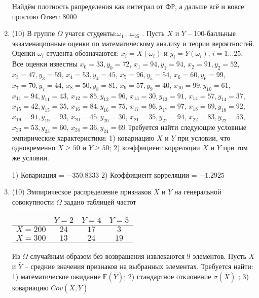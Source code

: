 \documentclass[a4paper,12pt]{article}
\begin{document}
\begin{enumerate}
Найдём плотность рапределения как интеграл от ФР, а дальше всё и вовсе простою Ответ: $8000$


\item


(10) В группе $\Omega$ учатся студенты:$\omega _{1}...\omega _{25}$ . Пусть $X$ и $Y$ – 100-балльные экзаменационные оценки по
математическому анализу и теории вероятностей. Оценки $\omega _{i}$ студента обозначаются: $x _{i} = X(\omega _{i})$ и $y _{i} = Y(\omega _{i})$, $i = 1...25$. Все оценки известны
$x _{0} = 33, y _{0} = 72$, $x _{1} = 94, y _{1} = 94$, $x _{2} = 91, y _{2} = 52$, $x _{3} = 47, y _{3} = 59$, $x _{4} = 53, y _{4} = 45$, $x _{5} = 96, y _{5} = 54$, $x _{6} = 60, y _{6} = 99$, $x _{7} = 70, y _{7} = 44$, $x _{8} = 50, y _{8} = 81$, $x _{9} = 57, y _{9} = 40$, $x _{10} = 99, y _{10} = 61$, $x _{11} = 94, y _{11} = 43$, $x _{12} = 85, y _{12} = 96$, $x _{13} = 30, y _{13} = 91$, $x _{14} = 57, y _{14} = 37$, $x _{15} = 42, y _{15} = 35$, $x _{16} = 84, y _{16} = 75$, $x _{17} = 96, y _{17} = 97$, $x _{18} = 69, y _{18} = 92$, $x _{19} = 91, y _{19} = 93$, $x _{20} = 45, y _{20} = 30$, $x _{21} = 35, y _{21} = 94$, $x _{22} = 83, y _{22} = 53$, $x _{23} = 53, y _{23} = 60$, $x _{24} = 36, y _{24} = 69$
Требуется
найти следующие условные эмпирические характеристики: 1) ковариацию $X$ и $Y$ при условии, что одновременно $X \geqslant 50$
 и $Y \geqslant 50$; 2) коэффициент корреляции $X$ и $Y$ при том же условии.




1) Ковариация = $-350.8333$
2) Коэффициент корреляции = $-1.2925$


\item


(10) Эмпирическое распределение признаков $X$ и $Y$ на генеральной совокупности $\Omega$ задано таблицей частот  
 
\begin{tabular}{ | c | c | c | c | }
\hline
 & $Y = 2$ & $Y = 4$ & $Y = 5$  \\ \hline
$X = 200$ & $24$ & $17$ & $3$\\ \hline
$X = 300$ & $13$ & $24$ & $19$\\
\hline
\end{tabular}

Из $\Omega$ случайным образом без возвращения извлекаются $9$ элементов. 
Пусть $\bar X$ и $\bar Y$ – средние значения признаков на выбранных элементах. 
Требуется найти: 1) математическое ожидание $\mathbb{E}(\bar Y)$; 2) стандартное отклонение $\sigma(\bar X)$ ; 
3) ковариацию $Cov(\bar X, \bar Y)$





\end{enumerate}
\end{document}
